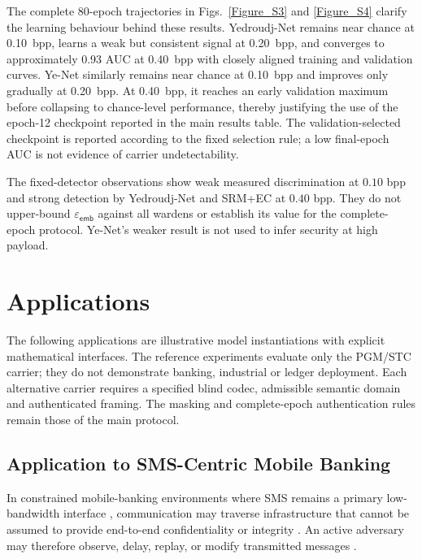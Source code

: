 \documentclass[journal]{IEEEtran}
\theoremstyle{definition}
\theoremstyle{game}
\begin{document}
The complete 80-epoch trajectories in
Figs.~\ref{Figure_S3} and
\ref{Figure_S4} clarify the learning behaviour behind
these results. Yedroudj-Net remains near chance at 0.10~bpp,
learns a weak but consistent signal at 0.20~bpp, and converges
to approximately 0.93 AUC at 0.40~bpp with closely aligned
training and validation curves. Ye-Net similarly remains near
chance at 0.10~bpp and improves only gradually at 0.20~bpp.
At 0.40~bpp, it reaches an early validation maximum before
collapsing to chance-level performance, thereby justifying the use
of the epoch-12 checkpoint reported in the main results table.
The validation-selected checkpoint is reported according to the fixed
selection rule; a low final-epoch AUC is not evidence of carrier
undetectability.

The fixed-detector observations show weak measured discrimination at
$0.10$ bpp and strong detection by Yedroudj-Net and SRM+EC at $0.40$ bpp.
They do not upper-bound $\varepsilon_{\mathsf{emb}}$ against all wardens
or establish its value for the complete-epoch protocol. Ye-Net's weaker result
is not used to infer security at high payload.

\section{Applications}\label{sec:applications}
The following applications are illustrative model instantiations with
explicit mathematical interfaces. The reference experiments evaluate
only the PGM/STC carrier; they do not demonstrate banking, industrial or
ledger deployment. Each alternative carrier requires a specified blind
codec, admissible semantic domain and authenticated framing. The masking
and complete-epoch authentication rules remain those of the main protocol.

\subsection{Application to SMS-Centric Mobile Banking}
\label{Application in SMS Mobile Banking}

In constrained mobile-banking environments where SMS remains a
primary low-bandwidth interface
\cite{gomez2014simple,vishnuvardhan2020study,saxena2014easysms,
Joshi2019A,Giménez2019Extending,Castiglione2015Secure},
communication may traverse infrastructure that cannot be assumed
to provide end-to-end confidentiality or integrity
\cite{Salman2023SMS,Riaz2018Development,Ardagna2009Privacy,
Reddy2017An,Fathi2013SMS}. An active adversary may therefore
observe, delay, replay, or modify transmitted messages
\cite{barkancipher2003cryptanalysis,nohl2017ss7,
meyer2004guitar}.
\end{document}
